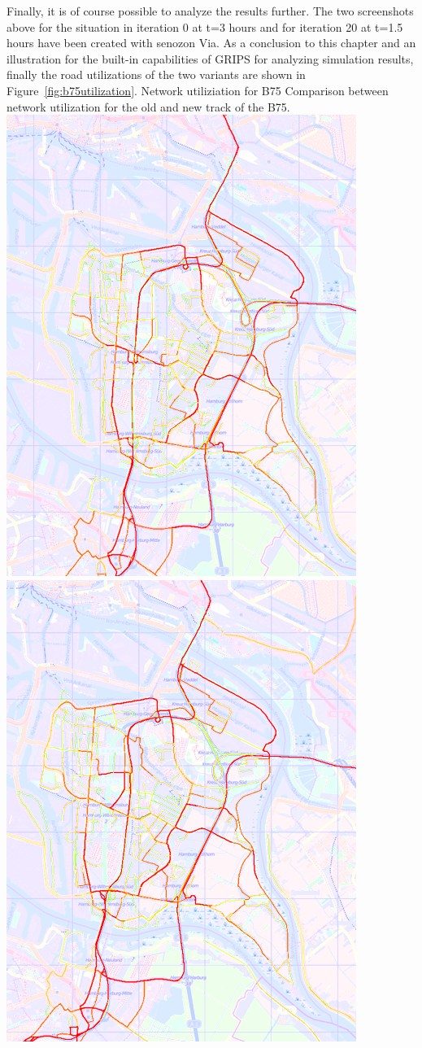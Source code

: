 Finally, it is of course possible to analyze the results further. The two screenshots above for the situation in iteration 0 at t=3 hours and for iteration 20 at t=1.5 hours have been created with senozon Via.
As a conclusion to this chapter and an illustration for the built-in capabilities of GRIPS for analyzing simulation results, finally the road utilizations of the two variants are shown in Figure~\ref{fig:b75utilization}.
%
\createfigure%
{Network utiliziation for B75}%
{Comparison between network utilization for the old and new track of the B75.}%
{\label{fig:b75utilization}}%
{%
  \createsubfigure%
  {}%
  {\includegraphics[width=.475\linewidth]{using/figures/b75utilizationold}}%
  {}%
  {}%
  \createsubfigure%
  {}%
  {\includegraphics[width=.475\linewidth]{using/figures/b75utilizationnew}}
  {}%
  {}%
}%
  {}%
